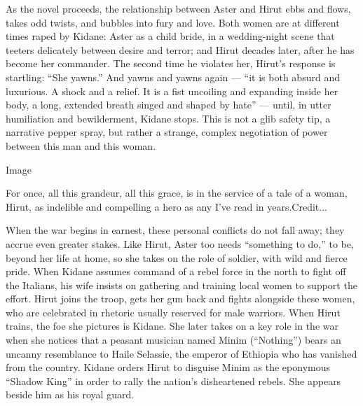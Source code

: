 As the novel proceeds, the relationship between Aster and Hirut ebbs and
flows, takes odd twists, and bubbles into fury and love. Both women are
at different times raped by Kidane: Aster as a child bride, in a
wedding-night scene that teeters delicately between desire and terror;
and Hirut decades later, after he has become her commander. The second
time he violates her, Hirut's response is startling: ``She yawns.'' And
yawns and yawns again --- ``it is both absurd and luxurious. A shock and
a relief. It is a fist uncoiling and expanding inside her body, a long,
extended breath singed and shaped by hate'' --- until, in utter
humiliation and bewilderment, Kidane stops. This is not a glib safety
tip, a narrative pepper spray, but rather a strange, complex negotiation
of power between this man and this woman.

Image

For once, all this grandeur, all this grace, is in the service of a tale
of a woman, Hirut, as indelible and compelling a hero as any I've read
in years.Credit...

When the war begins in earnest, these personal conflicts do not fall
away; they accrue even greater stakes. Like Hirut, Aster too needs
``something to do,'' to be, beyond her life at home, so she takes on the
role of soldier, with wild and fierce pride. When Kidane assumes command
of a rebel force in the north to fight off the Italians, his wife
insists on gathering and training local women to support the effort.
Hirut joins the troop, gets her gun back and fights alongside these
women, who are celebrated in rhetoric usually reserved for male
warriors. When Hirut trains, the foe she pictures is Kidane. She later
takes on a key role in the war when she notices that a peasant musician
named Minim (``Nothing'') bears an uncanny resemblance to Haile
Selassie, the emperor of Ethiopia who has vanished from the country.
Kidane orders Hirut to disguise Minim as the eponymous ``Shadow King''
in order to rally the nation's disheartened rebels. She appears beside
him as his royal guard.

